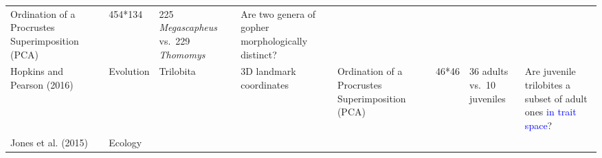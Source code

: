 \documentclass[]{article}
\begin{document}
\begin{longtable}[]{@{}llllllll@{}}
\begin{minipage}[t]{0.11\columnwidth}
Ordination of a Procrustes Superimposition (PCA)\strut
\end{minipage} & \begin{minipage}[t]{0.08\columnwidth}\raggedright\strut
454*134\strut
\end{minipage} & \begin{minipage}[t]{0.11\columnwidth}\raggedright\strut
225 \emph{Megascapheus} vs.~229 \emph{Thomomys}\strut
\end{minipage} & \begin{minipage}[t]{0.12\columnwidth}\raggedright\strut
Are two genera of gopher morphologically distinct?\strut
\end{minipage}\tabularnewline
\begin{minipage}[t]{0.08\columnwidth}\raggedright\strut
Hopkins and Pearson (2016)\strut
\end{minipage} & \begin{minipage}[t]{0.09\columnwidth}\raggedright\strut
Evolution\strut
\end{minipage} & \begin{minipage}[t]{0.09\columnwidth}\raggedright\strut
Trilobita\strut
\end{minipage} & \begin{minipage}[t]{0.11\columnwidth}\raggedright\strut
3D landmark coordinates\strut
\end{minipage} & \begin{minipage}[t]{0.11\columnwidth}\raggedright\strut
Ordination of a Procrustes Superimposition (PCA)\strut
\end{minipage} & \begin{minipage}[t]{0.08\columnwidth}\raggedright\strut
46*46\strut
\end{minipage} & \begin{minipage}[t]{0.11\columnwidth}\raggedright\strut
36 adults vs.~10 juveniles\strut
\end{minipage} & \begin{minipage}[t]{0.12\columnwidth}\raggedright\strut
Are juvenile trilobites a subset of adult ones
\textcolor{blue}{in trait space}?\strut
\end{minipage}\tabularnewline
\begin{minipage}[t]{0.08\columnwidth}\raggedright\strut
Jones et al. (2015)\strut
\end{minipage} & \begin{minipage}[t]{0.09\columnwidth}\raggedright\strut
Ecology\strut
\end{minipage} & \begin{minipage}[t]{0.09\columnwidth}\raggedright\strut

\end{minipage}
\end{longtable}
\end{document}
